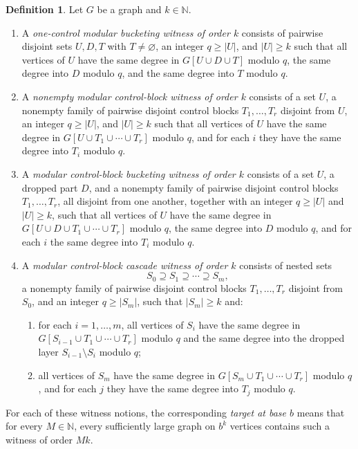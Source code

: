 \documentclass[11pt]{amsart}
\theoremstyle{definition}
\newtheorem{definition}[theorem]{Definition}
\newcommand{\N}{\mathbb{N}}
\begin{document}
\begin{definition}
Let $G$ be a graph and $k \in \N$.
\begin{enumerate}
  \item A \emph{one-control modular bucketing witness of order $k$} consists of pairwise disjoint
    sets $U,D,T$ with $T \neq \varnothing$, an integer $q \ge |U|$, and $|U| \ge k$ such that all
    vertices of $U$ have the same degree in $G[U \cup D \cup T]$ modulo $q$, the same degree into
    $D$ modulo $q$, and the same degree into $T$ modulo $q$.
  \item A \emph{nonempty modular control-block witness of order $k$} consists of a set $U$, a
    nonempty family of pairwise disjoint control blocks $T_1,\dots,T_r$ disjoint from $U$, an
    integer $q \ge |U|$, and $|U| \ge k$ such that all vertices of $U$ have the same degree in
    $G[U \cup T_1 \cup \cdots \cup T_r]$ modulo $q$, and for each $i$ they have the same degree into
    $T_i$ modulo $q$.
  \item A \emph{modular control-block bucketing witness of order $k$} consists of a set $U$, a
    dropped part $D$, and a nonempty family of pairwise disjoint control blocks
    $T_1,\dots,T_r$, all disjoint from one another, together with an integer $q \ge |U|$ and
    $|U| \ge k$, such that all vertices of $U$ have the same degree in
    $G[U \cup D \cup T_1 \cup \cdots \cup T_r]$ modulo $q$, the same degree into $D$ modulo $q$, and
    for each $i$ the same degree into $T_i$ modulo $q$.
  \item A \emph{modular control-block cascade witness of order $k$} consists of nested sets
    \[
      S_0 \supseteq S_1 \supseteq \cdots \supseteq S_m,
    \]
    a nonempty family of pairwise disjoint control blocks $T_1,\dots,T_r$ disjoint from $S_0$, and
    an integer $q \ge |S_m|$, such that $|S_m| \ge k$ and:
    \begin{enumerate}
      \item for each $i=1,\dots,m$, all vertices of $S_i$ have the same degree in
        $G[S_{i-1} \cup T_1 \cup \cdots \cup T_r]$ modulo $q$ and the same degree into the dropped
        layer $S_{i-1}\setminus S_i$ modulo $q$;
      \item all vertices of $S_m$ have the same degree in
        $G[S_m \cup T_1 \cup \cdots \cup T_r]$ modulo $q$, and for each $j$ they have the same
        degree into $T_j$ modulo $q$.
    \end{enumerate}
\end{enumerate}

For each of these witness notions, the corresponding \emph{target at base $b$} means that for every
$M \in \N$, every sufficiently large graph on $b^k$ vertices contains such a witness of order $Mk$.
\end{definition}
\end{document}
